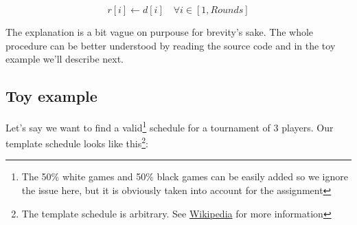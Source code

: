 \documentclass[a4paper, 10pt]{article}
\begin{document}
\begin{equation}
    \label{eq:remap}
    r[i] \leftarrow d[i] \quad \forall i \in [1, Rounds]
\end{equation}

The explanation is a bit vague on purpouse for brevity's sake. The whole procedure can be better understood by reading the source code and in the toy example we'll describe next.

\subsection{Toy example}
Let's say we want to find a valid\footnote{The 50\% white games and 50\% black games can be easily added so we ignore the issue here, but it is obviously taken into account for the assignment} schedule for a tournament of 3 players. Our template schedule
looks like this\footnote{The template schedule is arbitrary. See \href{https://en.wikipedia.org/wiki/Round-robin\_tournament\#Berger\_tables}{Wikipedia} for more information}:
\end{document}
